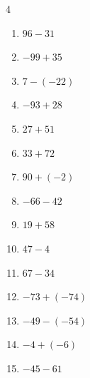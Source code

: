 \begin{multicols}{4}
\begin{enumerate}
        \phantom{$=-32$}

  \item $96-31$

        \phantom{$=65$}

  \item $-99+35$

        \phantom{$=-64$}

  \item $7-(-22)$

        \phantom{$=29$}

  \item $-93+28$

        \phantom{$=-65$}

\columnbreak %

\resetques

  \item $27+51$

        \phantom{$=78$}

  \item $33+72$

        \phantom{$=105$}

  \item $90+(-2)$

        \phantom{$=88$}

  \item $-66-42$

        \phantom{$=-108$}

  \item $19+58$

        \phantom{$=77$}

  \item $47-4$

        \phantom{$=43$}

  \item $67-34$

        \phantom{$=33$}

  \item $-73+(-74)$

        \phantom{$=-147$}

  \item $-49-(-54)$

        \phantom{$=5$}

  \item $-4+(-6)$

        \phantom{$=-10$}

  \item $-45-61$

        \phantom{$=-106$}


\end{enumerate}
\end{multicols}
